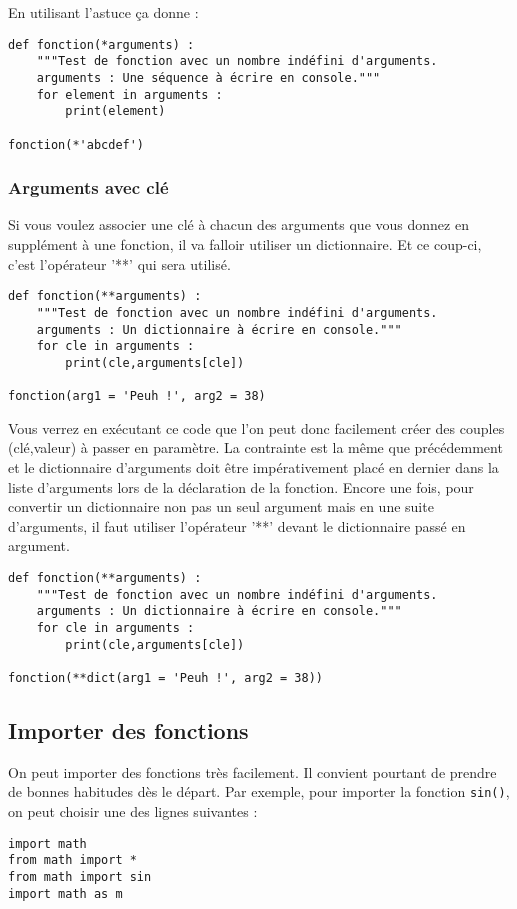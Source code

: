 \documentclass[a4paper,twoside]{article}
\begin{document}
En utilisant l'astuce  ça donne :
\begin{verbatim}
def fonction(*arguments) :
    """Test de fonction avec un nombre indéfini d'arguments.
    arguments : Une séquence à écrire en console."""
    for element in arguments :
        print(element)

fonction(*'abcdef')
\end{verbatim}

\subsubsection{Arguments avec clé}

Si vous voulez associer une clé à chacun des arguments que vous donnez en supplément à une fonction, il va falloir utiliser un dictionnaire. Et ce coup-ci, c'est l'opérateur '**' qui sera utilisé.

\begin{verbatim}
def fonction(**arguments) :
    """Test de fonction avec un nombre indéfini d'arguments.
    arguments : Un dictionnaire à écrire en console."""
    for cle in arguments :
        print(cle,arguments[cle])

fonction(arg1 = 'Peuh !', arg2 = 38)
\end{verbatim}

Vous verrez en exécutant ce code que l'on peut donc facilement créer des couples (clé,valeur) à passer en paramètre. La contrainte est la même que précédemment et le dictionnaire d'arguments doit être impérativement placé en dernier dans la liste d'arguments lors de la déclaration de la fonction. Encore une fois, pour convertir un dictionnaire non pas un seul argument mais en une suite d'arguments, il faut utiliser l'opérateur '**' devant le dictionnaire passé en argument.

\begin{verbatim}
def fonction(**arguments) :
    """Test de fonction avec un nombre indéfini d'arguments.
    arguments : Un dictionnaire à écrire en console."""
    for cle in arguments :
        print(cle,arguments[cle])

fonction(**dict(arg1 = 'Peuh !', arg2 = 38))
\end{verbatim}

\subsection{Importer des fonctions}\label{sec:importer_fonctions}
On peut importer des fonctions très facilement. Il convient pourtant de prendre de bonnes habitudes dès le départ. Par exemple, pour importer la fonction \texttt{sin()}, on peut choisir une des lignes suivantes :
\begin{verbatim}
import math
from math import *
from math import sin
import math as m
\end{verbatim}
\end{document}
